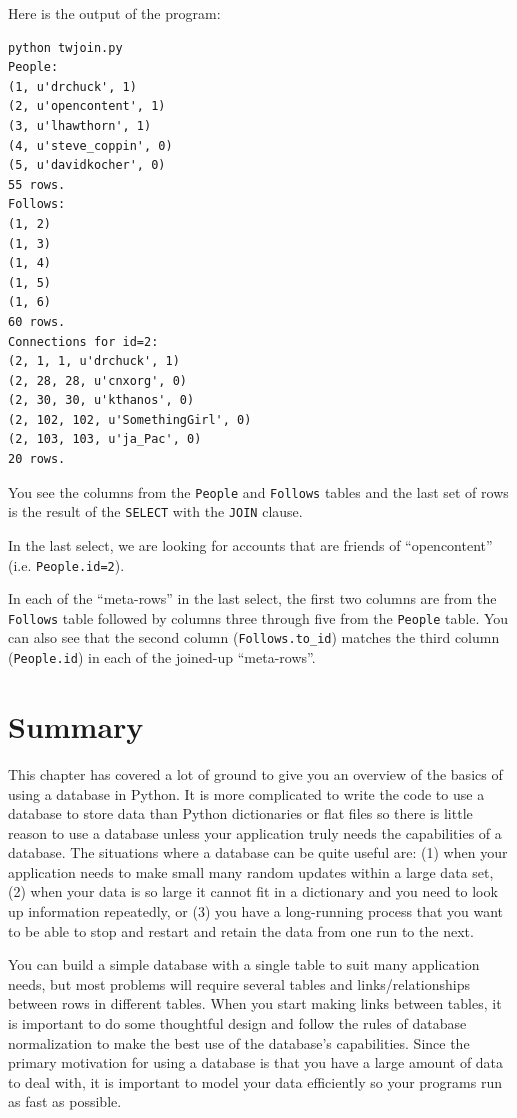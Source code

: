 Here is the output of the program:

\beforeverb
\begin{verbatim}
python twjoin.py 
People:
(1, u'drchuck', 1)
(2, u'opencontent', 1)
(3, u'lhawthorn', 1)
(4, u'steve_coppin', 0)
(5, u'davidkocher', 0)
55 rows.
Follows:
(1, 2)
(1, 3)
(1, 4)
(1, 5)
(1, 6)
60 rows.
Connections for id=2:
(2, 1, 1, u'drchuck', 1)
(2, 28, 28, u'cnxorg', 0)
(2, 30, 30, u'kthanos', 0)
(2, 102, 102, u'SomethingGirl', 0)
(2, 103, 103, u'ja_Pac', 0)
20 rows.
\end{verbatim}
\afterverb
%
You see the columns from the {\tt People} and {\tt Follows} tables and the last
set of rows is the result of the {\tt SELECT} with the {\tt JOIN} clause.

In the last select, we are looking for accounts that are friends of 
``opencontent'' (i.e. {\tt People.id=2}).

In each of the ``meta-rows'' in the last select, the first two columns are
from the {\tt Follows}
table followed by columns three through five from the {\tt People} table.  You can also
see that the second column (\verb"Follows.to_id") matches the third column
({\tt People.id}) in each of the joined-up ``meta-rows''.

\section{Summary}

This chapter has covered a lot of ground to give you an overview of the basics
of using a database in Python.   It is more complicated to write the code to use 
a database to store data than Python dictionaries or flat files so there is 
little reason to use a database unless your application truly needs the capabilities
of a database.  The situations where a database can be quite useful are: 
(1) when your application needs to make small many random updates within a large data set,
(2) when your data is so large it cannot fit in a dictionary and you need to 
look up information repeatedly, or
(3) you have a long-running process that you want to be able to stop 
and restart and retain the data from one run to the next.

You can build a simple database with a single table to suit many application 
needs, but most problems will require several tables and links/relationships
between rows in different tables.   When you start making links between 
tables, it is important to do some thoughtful design and follow the 
rules of database normalization to make the best use of the database's
capabilities.  Since the primary motivation for using a database
is that you have a large amount of data to deal with, it is important
to model your data efficiently so your programs run as fast as possible.

